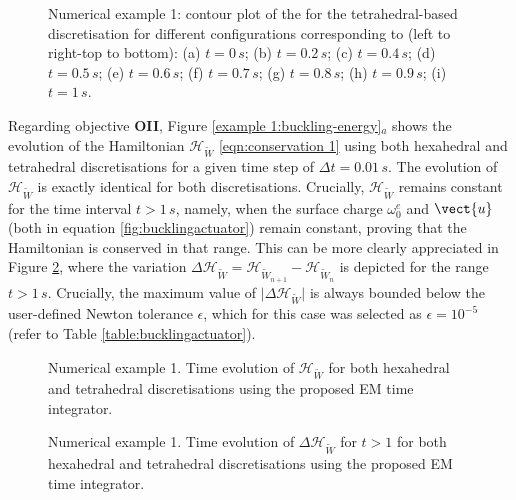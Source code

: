 \begin{figure}[htbp]
	\centering
	\caption{Numerical example 1: contour plot of the  for the tetrahedral-based discretisation for different configurations corresponding to (left to right-top to bottom): (a) $t=0\,s$;  (b) $t=0.2\,s$; (c) $t=0.4\,s$; (d) $t=0.5\,s$; (e) $t=0.6\,s$; (f) $t=0.7\,s$; (g) $t=0.8\,s$; (h) $t=0.9\,s$; (i) $t=1\,s$.}
	\label{f:buckling-snaps tets}
\end{figure}

Regarding objective \textbf{OII}, Figure \ref{example 1:buckling-energy}$_a$ shows the evolution of the Hamiltonian $\mathcal{H}_{\widetilde{W}}$ \eqref{eqn:conservation 1} using both hexahedral and tetrahedral discretisations for a given time step of $\Delta t = 0.01\,s$. The evolution of  $\mathcal{H}_{\widetilde{W}}$ is exactly identical for both discretisations. Crucially, $\mathcal{H}_{\widetilde{W}}$ remains constant for the time interval $t>1\,s$, namely, when the surface charge $\omega_0^e$ and $\vect{u}$ (both in equation \eqref{fig:bucklingactuator}) remain constant, proving that the Hamiltonian is conserved in that range. This can be more clearly appreciated in Figure \ref{example 1:buckling-energydiff}, where the variation $\Delta\mathcal{H}_{\widetilde{W}}=\mathcal{H}_{\widetilde{W}_{n+1}} - \mathcal{H}_{\widetilde{W}_{n}}$ is depicted for the range $t>1\,s$. Crucially, the maximum value of $\vert\Delta\mathcal{H}_{\widetilde{W}}\vert$ is always bounded below the user-defined Newton tolerance $\epsilon$,  which for this case was selected as $\epsilon = 10^{-5}$ (refer to Table \ref{table:bucklingactuator}).
%
\begin{figure}[h!]
\begin{minipage}[b!]{0.475\textwidth}
\centering
      \setlength{\figH}{0.25\textheight}
					\setlength{\figW}{0.8\textwidth}
	\vspace{-0mm}					
					
  \caption{Numerical example 1. Time evolution of $\mathcal{H}_{\widetilde{W}}$ for both hexahedral and  tetrahedral discretisations using the proposed EM time integrator.}
  \label{example 1:buckling-energy}
\end{minipage}
\hfill
\begin{minipage}[b!]{0.475\textwidth}
   \centering
      \setlength{\figH}{0.25\textheight}
					\setlength{\figW}{0.8\textwidth}
	\vspace{-2mm}
					
  \caption{Numerical example 1. Time evolution of $\Delta\mathcal{H}_{\widetilde{W}}$ for $t>1$ for both hexahedral and tetrahedral discretisations using the proposed EM time integrator.}
  \label{example 1:buckling-energydiff}
\end{minipage}
\end{figure}


